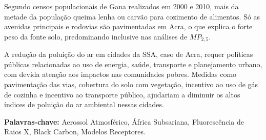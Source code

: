 Segundo censos populacionais de Gana realizados em 2000 e 2010, 
mais da metade da população queima lenha ou carvão para cozimento 
de alimentos. Só as avenidas principais e rodovias são pavimentadas em Acra, 
o que explica o forte peso da fonte solo, predominando 
inclusive nas análises de $MP_{2,5}$.

A redução da poluição do ar em cidades da SSA, caso de Acra, 
requer políticas públicas relacionadas ao uso de energia, saúde, 
transporte e planejamento urbano, com devida atenção 
aos impactos nas comunidades pobres. 
Medidas como pavimentação das vias, cobertura do solo com vegetação, 
incentivo ao uso de gás de cozinha e incentivo ao transporte público, 
ajudariam a diminuir os altos índices de poluição do ar ambiental nessas cidades.

\par
\vspace{1em}
\noindent\textbf{Palavras-chave:}  Aerossol Atmosférico, África Subsariana, Fluorescência de Raios X, Black Carbon, Modelos Receptores.
